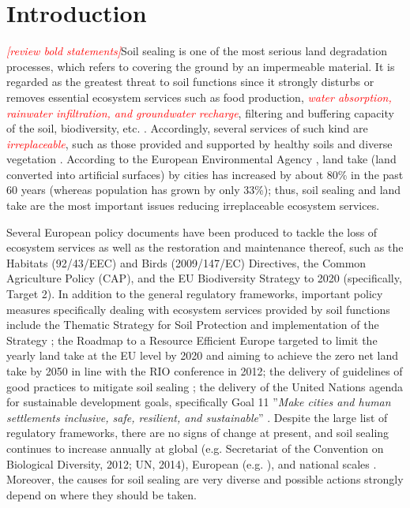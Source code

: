 \documentclass[APA,LATO1COL,doublespace]{WileyNJD-v2}
\newcommand{\toberevised}[1]{\emph{\textcolor{red}{#1}}} %
\begin{document}
\maketitle


\section{Introduction}\label{sec1}
\toberevised{[review bold statements]\;}Soil sealing is one of the most serious land degradation processes, which refers to covering the ground by an impermeable material.
It is regarded as the greatest threat to soil functions since it strongly disturbs or removes essential ecosystem services such as food production, \toberevised{water absorption, rainwater infiltration, and groundwater recharge}, filtering and buffering capacity of the soil, biodiversity, etc. \citep{FAO15}.
Accordingly, several services of such kind are \toberevised{irreplaceable}, such as those provided and supported by healthy soils and diverse vegetation \citep{Dunbar13}.
According to the European Environmental Agency \citep{EEA2011}, land take (land converted into artificial surfaces) by cities has increased by about 80\% in the past 60 years (whereas population has grown by only 33\%); thus, soil sealing and land take are the most important issues reducing irreplaceable ecosystem services.

Several European policy documents have been produced to tackle the loss of ecosystem services as well as the restoration and maintenance thereof, such as the Habitats (92/43/EEC) and Birds (2009/147/EC) Directives, the Common Agriculture Policy (CAP), and the EU Biodiversity Strategy to 2020 (specifically, Target 2).
In addition to the general regulatory frameworks, important policy measures specifically dealing with ecosystem services provided by soil functions include the Thematic Strategy for Soil Protection \citep{EC2006} and implementation of the Strategy \citep{EC2012}; the Roadmap to a Resource Efficient Europe \citep{EC2011a} targeted to limit the yearly land take at the EU level by 2020 and aiming to achieve the zero net land take by 2050 in line with the RIO conference in 2012; the delivery of guidelines of good practices to mitigate soil sealing \citep{SWD12}; the delivery of the United Nations agenda \citep{UN15} for sustainable development goals, specifically Goal 11 ''\textit{Make cities and human settlements inclusive, safe, resilient, and sustainable}'' \citep{Keesstra16}.
Despite the large list of regulatory frameworks, there are no signs of change at present, and soil sealing continues to increase annually \citep{FAO15} at global (e.g. Secretariat of the Convention on Biological Diversity, 2012; UN, 2014), European (e.g. \citealp{SWD12}), and national scales \citep[e.g.][Copernicus Land Monitoring Service\footnote{ http://land.copernicus.eu}]{ISPRA16,ISPRA18}.
Moreover, the causes for soil sealing are very diverse and possible actions strongly depend on where they should be taken.
\end{document}
